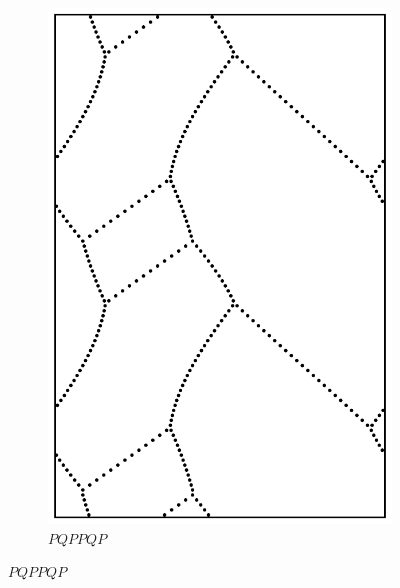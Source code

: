 \documentclass[12pt,twoside]{reedthesis}
\theoremstyle{definition}
\begin{document}
\begin{figure}[b!]
\begin{subfigure}[t]{0.24\textwidth}
    \includegraphics[width=\textwidth]{figures/string_cheese_appendix/pqppqp.pdf}
    \caption*{$PQPPQP$}
    \vspace{5mm}
  \end{subfigure}
\end{figure}
\end{document}
